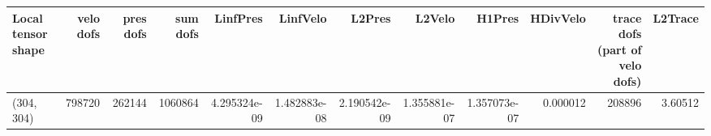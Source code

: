 \begin{tabular}{lrrrrrrrrrrr}
\toprule
Local tensor shape &  velo dofs &  pres dofs &  sum dofs &     LinfPres &     LinfVelo &       L2Pres &       L2Velo &       H1Pres &  HDivVelo &  trace dofs (part of velo dofs) &  L2Trace \\
\midrule
        (304, 304) &     798720 &     262144 &   1060864 & 4.295324e-09 & 1.482883e-08 & 2.190542e-09 & 1.355881e-07 & 1.357073e-07 &  0.000012 &                          208896 &  3.60512 \\
\bottomrule
\end{tabular}
